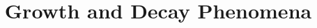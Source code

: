 \documentclass{beamer}
\title[Section 2.3]{Growth and Decay Phenomena}
\begin{document}
\begin{frame}
\titlepage
\end{frame}
\end{document}
